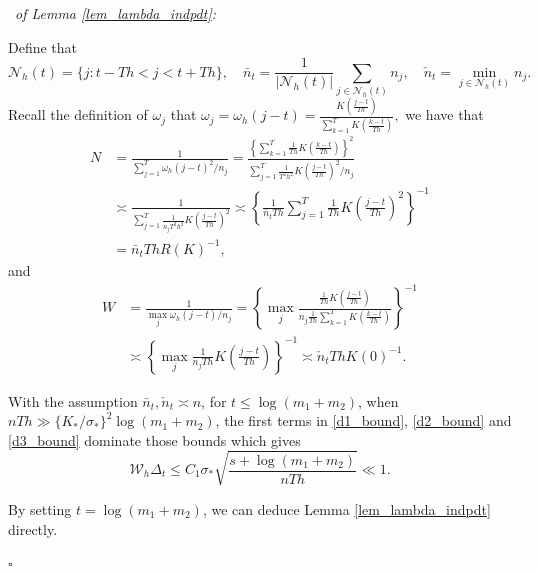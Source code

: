 \documentclass[12pt]{article}
\newenvironment{pf}{{\noindent\it Proof}\ }{\hfill $\square$\par}
\begin{document}
  \begin{pf}{\it of Lemma \ref{lem_lambda_indpdt}:}

  Define that $$\mathcal{N}_h(t)=\{j:t-Th<j<t+Th\},\quad \bar{n}_t=\frac{1}{|\mathcal{N}_h(t)|}\sum_{j\in\mathcal{N}_h(t)}n_j,\quad \check{n}_t=\min_{j\in\mathcal{N}_h(t)}n_j.$$
  Recall the definition of $\omega_j$ that
  $\omega_j=\omega_h(j-t)=\frac{K\left(\frac{j-t}{Th}\right)}{\sum_{k=1}^T K\left(\frac{k-t}{Th}\right)},
  $ we have that
  \begin{align*}
  N&= \frac{1}{\sum_{j=1}^T \omega_h(j-t)^2/n_j}
  = \frac{\left\{\sum_{k=1}^T\frac{1}{Th}K\left(\frac{k-t}{Th}\right)\right\}^2}{\sum_{j=1}^T  \frac{1}{T^2h^2}K\left(\frac{j-t}{Th}\right)^2/n_j}\\ 
  &\asymp\frac{1}{\sum_{j=1}^T  \frac{1}{n_jT^2h^2}K\left(\frac{j-t}{Th}\right)^2}
  \asymp\left\{\frac{1}{\bar{n}_tTh}\sum_{j=1}^T\frac{1}{Th}K\left(\frac{j-t}{Th}\right)^2\right\}^{-1}\\
  &=\bar{n}_tThR(K)^{-1},
  \end{align*}
  and
  \begin{align*}
  W&=\frac{1}{\max_j \omega_h(j-t)/n_j}=\left\{\max_j\frac{\frac{1}{Th}K\left(\frac{j-t}{Th}\right)}{n_j\frac{1}{Th}\sum_{k=1}^T K\left(\frac{k-t}{Th}\right)}\right\}^{-1}\\
  &\asymp\left\{\max_j{\frac{1}{n_jTh}K\left(\frac{j-t}{Th}\right)}\right\}^{-1}
  \asymp \check{n}_tThK(0)^{-1}.
  \end{align*}
  
  With the assumption $\bar{n}_t,\check{n}_t \asymp n$, for $t\le\log(m_1+m_2)$, when $nTh\gg\{K_*/\sigma_*\}^2 \log(m_1+m_2)$, the first terms in \eqref{d1_bound}, \eqref{d2_bound} and \eqref{d3_bound} dominate those bounds which gives
  $$\mathcal{W}_h\Delta_{t}  \le {C_1}\sigma_*\sqrt{\frac{s+\log(m_1+m_2)}{nTh}}\ll1.$$

  By setting $t=\log (m_1+m_2)$, we can deduce Lemma \ref{lem_lambda_indpdt} directly.
  
\end{pf}
  
 
  
\end{document}
